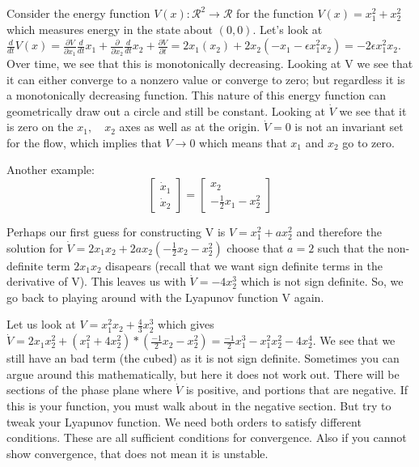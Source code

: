 \documentclass[11pt]{article}
\begin{document}
Consider the energy function $V(x): \mathcal{R}^2 \rightarrow \mathcal{R}$ for the function $V(x) = x_1^2 + x_2^2$ which measures energy in the state about $(0,0)$.		
Let's look at $\frac{d}{dt}V(x) = \frac{\partial V}{\partial x_1}\frac{d}{dt}x_1 + \frac{\partial}{\partial x_2}\frac{d}{dt}x_2 + \frac{\partial V}{\partial t} = 2x_1(x_2) + 2x_2(-x_1 - \epsilon x_1^2 x_2) = -2\epsilon x_1^2 x_2$. Over time, we see that this is monotonically decreasing. Looking at V we see that it can either converge to a nonzero value or converge to zero; but regardless it is a monotonically decreasing function. This nature of this energy function can geometrically draw out a circle and still be constant. Looking at $\dot{V}$ we see that it is zero on the $x_1, \quad x_2$ axes as well as at the origin. $\dot{V}=0$ is not an invariant set for the flow, which implies that $V\rightarrow0$ which means that $x_1$ and $x_2$ go to zero.

Another example:
\begin{equation}
\begin{bmatrix}
\dot{x}_1 \\
\dot{x}_2
\end{bmatrix} =
\begin{bmatrix}
x_2 \\
-\frac{1}{2}x_1 - x_2^2 
\end{bmatrix}
\end{equation}

Perhaps our first guess for constructing V is $V = x_1^2 + ax_2^2$ and therefore the solution for $\dot{V} = 2x_1x_2 + 2ax_2(-\frac{1}{2}x_2 - x_2^2) $ choose that $a=2$ such that the non-definite term $2x_1x_2$ disapears (recall that we want sign definite terms in the derivative of V). This leaves us with $\dot{V} = -4x_2^3$ which is not sign definite. So, we go back to playing around with the Lyapunov function V again. 


Let us look at $V = x_1^2x_2 + \frac{4}{3}x_2^3$ which gives $\dot{V} = 2x_1x_2^2 + (x_1^2 + 4x_2^2)*(\frac{-1}{2}x_2 - x_2^2) = \frac{-1}{2}x_1^3 - x_1^2x_2^2 - 4x_2^4$. We see that we still have an bad term (the cubed) as it is not sign definite. Sometimes you can argue around this mathematically, but here it does not work out. There will be sections of the phase plane where $\dot{V}$ is positive, and portions that are negative. If this is your function, you must walk about in the negative section. But try to tweak your Lyapunov function. We need both orders to satisfy different conditions. These are all sufficient conditions for convergence. Also if you cannot show convergence, that does not mean it is unstable.
\end{document}
